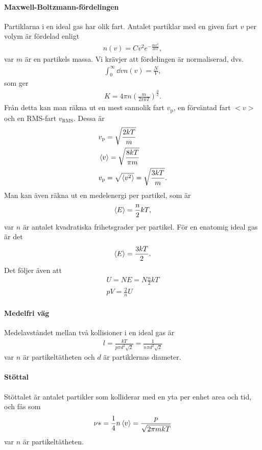 \paragraph{Maxwell-Boltzmann-fördelingen}
Partiklarna i en ideal gas har olik fart. Antalet partiklar med en given fart $v$ per volym är fördelad enligt
\begin{align*}
	n(v) = Cv^2e^{-\frac{mv^2}{2kT}},
\end{align*}
var $m$ är en partikels massa. Vi krävjer att fördelingen är normaliserad, dvs.
\begin{align*}
	\int_0^{\infty}\dd{v}n(v) = \frac{N}{V},
\end{align*}
som ger
\begin{align*}
	K = 4\pi n \left(\frac{m}{2\pi kT}\right)^\frac{3}{2}.
\end{align*}
Från detta kan man räkna ut en mest sannolik fart $v_\text{p}$, en förväntad fart $<v>$ och en RMS-fart $v_\text{RMS}$. Dessa är
\begin{align*}
	& v_\text{p} = \sqrt{\frac{2kT}{m}}\\
	& \expval{v} = \sqrt{\frac{8kT}{\pi m}}\\
	& v_\text{p} = \sqrt{\expval{v^2}} = \sqrt{\frac{3kT}{m}}.
\end{align*}
Man kan även räkna ut en medelenergi per partikel, som är
\begin{align*}
	\expval{E} = \frac{n}{2}kT,
\end{align*}
var $n$ är antalet kvadratiska frihetsgrader per partikel. För en enatomig ideal gas är det
\begin{align*}
	\expval{E} = \frac{3kT}{2}.
\end{align*}
Det följer även att
\begin{align*}
	U = NE = N\frac{n}{2}kT\\
	pV = \frac{2}{n}U
\end{align*}

\paragraph{Medelfri väg}
Medelavståndet mellan två kollisioner i en ideal gas är
\begin{align*}
	l = \frac{kT}{p\pi d^2\sqrt{2}} = \frac{1}{n\pi d^2\sqrt{2}}
\end{align*}
var $n$ är partikeltätheten och $d$ är partiklernas diameter.

\paragraph{Stöttal}
Stöttalet är antalet partikler som kolliderar med en yta per enhet area och tid, och fås som
\begin{align*}
	\nu * = \frac{1}{4}n\expval{v} = \frac{p}{\sqrt{2\pi mkT}}
\end{align*}
var $n$ är partikeltätheten.

